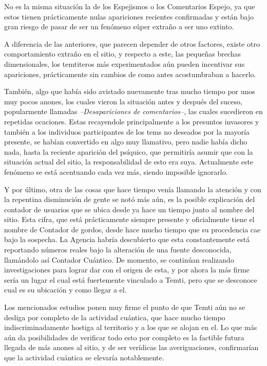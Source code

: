 \documentclass[
  spanish,
]{book}
\begin{document}
No es la misma situación la de los Espejismos o los Comentarios Espejo, ya que estos tienen prácticamente nulas apariciones recientes confirmadas y están bajo gran riesgo de pasar de ser un fenómeno súper extraño a ser uno extinto.

A diferencia de las anteriores, que parecen depender de otros factores, existe otro comportamiento extraño en el sitio, y respecto a este, las pequeñas brechas dimensionales, los temtiteros más experimentados aún pueden incentivar sus apariciones, prácticamente sin cambios de como antes acostumbraban a hacerlo.

También, algo que había sido avistado nuevamente tras mucho tiempo por unos muy pocos anones, los cuales vieron la situación antes y después del suceso, popularmente llamadas \emph{--Desapariciones de comentarios--}, las cuales sucedieron en repetidas ocaciones. Estas recayendole principalmente a los presuntos invasores y también a los individuos participantes de los tems no deseados por la mayoría presente, se habían convertido en algo muy llamativo, pero nadie había dicho nada, hasta la reciente aparición del psíquico, que permitiría asumir que con la situación actual del sitio, la responsabilidad de esto era suya. Actualmente este fenómeno se está acentuando cada vez más, siendo imposible ignorarlo.

Y por último, otra de las cosas que hace tiempo venía llamando la atención y con la repentina disminución de gente se notó más aún, es la posible explicación del contador de usuarios que se ubica desde ya hace un tiempo junto al nombre del sitio. Esta cifra, que está prácticamente siempre presente y oficialmente tiene el nombre de Contador de gordos, desde hace mucho tiempo que su procedencia cae bajo la sospecha. La Agencia habría descubierto que esta constantemente está reportando números reales bajo la alteración de una fuente desconocida, llamándolo así Contador Cuántico. De momento, se continúan realizando investigaciones para lograr dar con el origen de esta, y por ahora la más firme sería un lugar el cual está fuertemente vinculado a Temti, pero que se desconoce cual es su ubicación y como llegar a el.

Los mencionados estudios ponen muy firme el punto de que Temti aún no se desliga por completo de la actividad cuántica, que hace mucho tiempo indiscriminadamente hostiga al territorio y a los que se alojan en el. Lo que más aún da posibilidades de verificar todo esto por completo es la factible futura llegada de más anones al sitio, y de ser verídicas las averiguaciones, confirmarían que la actividad cuántica se elevaría notablemente.
\end{document}
